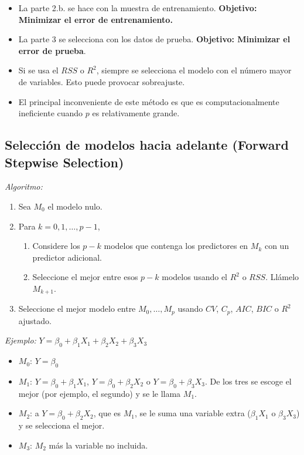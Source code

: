 \documentclass[
  12pt,
]{book}
\providecommand{\tightlist}{%
  \setlength{\itemsep}{0pt}\setlength{\parskip}{0pt}}
\theoremstyle{definition}
\theoremstyle{definition}
\theoremstyle{definition}
\theoremstyle{definition}
\theoremstyle{remark}
\begin{document}
\begin{itemize}
\tightlist
\item
  La parte 2.b. se hace con la muestra de entrenamiento. \textbf{Objetivo: Minimizar el error de entrenamiento.}
\item
  La parte 3 se selecciona con los datos de prueba. \textbf{Objetivo: Minimizar el error de prueba}.
\item
  Si se usa el \(RSS\) o \(R^2\), siempre se selecciona el modelo con el número mayor de variables. Esto puede provocar sobreajuste.
\item
  El principal inconveniente de este método es que es computacionalmente ineficiente cuando \(p\) es relativamente grande.
\end{itemize}

\hypertarget{selecciuxf3n-de-modelos-hacia-adelante-forward-stepwise-selection}{%
\subsection{\texorpdfstring{Selección de modelos hacia adelante (\textbf{Forward Stepwise Selection})}{Selección de modelos hacia adelante (Forward Stepwise Selection)}}\label{selecciuxf3n-de-modelos-hacia-adelante-forward-stepwise-selection}}

\emph{Algoritmo:}

\begin{enumerate}
\def\labelenumi{\arabic{enumi}.}
\tightlist
\item
  Sea \(M_0\) el modelo nulo.
\item
  Para \(k=0,1,\dots,p-1\),

  \begin{enumerate}
  \def\labelenumii{\alph{enumii}.}
  \tightlist
  \item
    Considere los \(p-k\) modelos que contenga los predictores en \(M_k\) con un predictor adicional.
  \item
    Seleccione el mejor entre esos \(p-k\) modelos usando el \(R^2\) o \(RSS\). Llámelo \(M_{k+1}\).
  \end{enumerate}
\item
  Seleccione el mejor modelo entre \(M_0,\dots, M_p\) usando \(CV\), \(C_p\), \(AIC\), \(BIC\) o \(R^2\) ajustado.
\end{enumerate}

\emph{Ejemplo:} \(Y=\beta_0+\beta_1X_1+\beta_2X_2+\beta_3X_3\)

\begin{itemize}
\item
  \(M_0\): \(Y = \beta_0\)
\item
  \(M_1\): \(Y = \beta_0+\beta_1X_1\), \(Y = \beta_0+\beta_2X_2\) o \(Y = \beta_0+\beta_3X_3\). De los tres se escoge el mejor (por ejemplo, el segundo) y se le llama \(M_1\).
\item
  \(M_2\): a \(Y = \beta_0+\beta_2X_2\), que es \(M_1\), se le suma una variable extra (\(\beta_1X_1\) o \(\beta_3X_3\)) y se selecciona el mejor.
\item
  \(M_3\): \(M_2\) más la variable no incluida.
\end{itemize}
\end{document}
